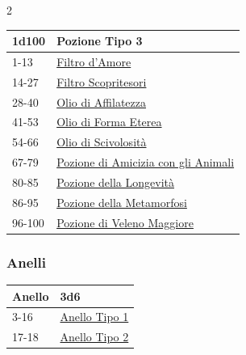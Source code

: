 \begin{multicols}{2}
{{\small\begin{tabularx}{\linewidth}{ll}
		\toprule
\rowcolor{gray!20}\textbf{1d100} & \textbf{Pozione Tipo 3}\\
\toprule
1-13& \hyperlink{Filtro d'Amore}{Filtro d'Amore}\\
\rowcolor{gray!20}14-27 & \hyperlink{Filtro Scopritesori}{Filtro Scopritesori}\\
28-40 & \hyperlink{Olio di Affilatezza}{Olio di Affilatezza}\\
\rowcolor{gray!20}41-53 & \hyperlink{Olio di Forma Eterea}{Olio di Forma Eterea}\\
54-66 & \hyperlink{Olio di Scivolosità}{Olio di Scivolosità}\\
\rowcolor{gray!20}67-79 & \hyperlink{Pozione di Amicizia con gli Animali}{Pozione di Amicizia con gli Animali}\\
80-85 & \hyperlink{Pozione della Longevità}{Pozione della Longevità}\\
\rowcolor{gray!20}86-95 & \hyperlink{Pozione della Metamorfosi}{Pozione della Metamorfosi}\\
96-100&\hyperlink{pozionifiltri}{Pozione di Veleno Maggiore}
\end{tabularx}}

\subsubsection{Anelli}\hypertarget{anellimagici}{}\label{anellimagici}

{\small\begin{tabularx}{\linewidth}{ll}
		\toprule
\rowcolor{gray!20}\textbf{Anello}&\textbf{3d6}\\
\toprule
3-16&\hyperlink{Pozione Tipo 3}{Anello Tipo 1} \\
\rowcolor{gray!20}17-18&\hyperlink{Pozione Tipo 3}{Anello Tipo 2}
\end{tabularx}}

\medskip\hypertarget{Anello Tipo 1}{}

}
\end{multicols}
